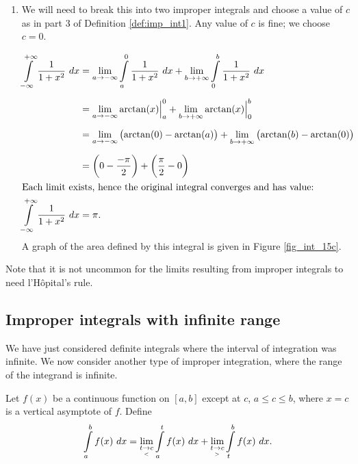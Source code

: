 \begin{example}
\begin{enumerate}
\item		We will need to break this into two improper integrals and choose a value of $c$ as in part 3 of Definition \ref{def:imp_int1}. Any value of $c$ is fine; we choose $c=0$.

\begin{align*}%
		\ds \int\limits_{-\infty}^{+\infty} \frac1{1+x^2}\ dx &= \lim_{a\to-\infty} \ds \int\limits_a^0\frac{1}{1+x^2}\ dx + \lim_{b\to+\infty} \ds \int\limits_0^b\frac{1}{1+x^2}\ dx \\[0.2cm]
						&= \lim_{a\to-\infty} \arctan(x)\Big|_a^0 + \lim_{b\to+\infty} \arctan(x)\Big|_0^b\\[0.2cm]
						&= \lim_{a\to-\infty} \left(\arctan(0)-\arctan(a)\right) + \lim_{b\to+\infty} \left(\arctan(b)-\arctan(0)\right)\\[0.2cm]		
						&= \left(0-\frac{-\pi}2\right) + \left(\frac{\pi}2-0\right)\\
						\intertext{Each	limit exists, hence the original integral converges and has value:}
		\ds \int\limits_{-\infty}^{+\infty} \frac1{1+x^2}\ dx &= \pi.
\end{align*}
A graph of the area defined by this integral is given in Figure \ref{fig_int_15c}.



\end{enumerate}
\end{example}

Note that it is not uncommon for the limits resulting from improper integrals to need l'H\^opital's rule.

\subsection{Improper integrals with infinite range}

We have just considered definite integrals where the interval of integration was infinite. We now consider another type of improper integration, where the range of the integrand is infinite.


\begin{definition}\label{def:imp_int2}
Let $f(x)$ be a continuous function on $[a,b]$ except at $c$, $a\leq c\leq b$, where $x=c$ is a vertical asymptote of $f$. Define
$$\displaystyle \int\limits_a^b f(x)\ dx = \lim_{t\underset{<}{\rightarrow}c}\displaystyle \int\limits_a^t f(x)\ dx + \lim_{t\underset{>}{\rightarrow}c}\displaystyle \int\limits_t^b f(x)\ dx.$$
\end{definition}



